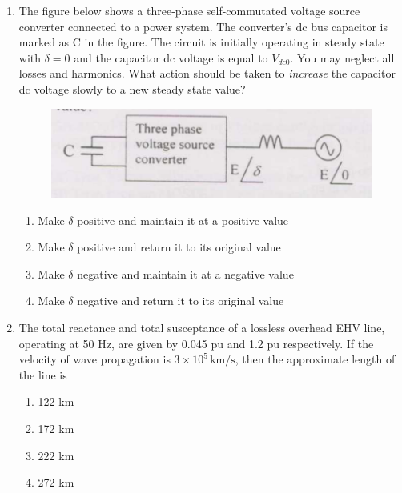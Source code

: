\documentclass[journal]{IEEEtran}
\numberwithin{equation}{enumi}
\numberwithin{figure}{enumi}
\begin{document}
\begin{enumerate}
   \bigskip
   \item The figure below shows a three-phase self-commutated voltage source converter connected to a power system. The converter's dc bus capacitor is marked as C in the figure. The circuit is initially operating in steady state with $\delta = 0$ and the capacitor dc voltage is equal to $V_{dc0}$. You may neglect all losses and harmonics. What action should be taken to \textit{increase} the capacitor dc voltage slowly to a new steady state value?
   \begin{figure}[!ht]
    \centering
    \includegraphics[width=\linewidth]{figs/9.png}
    \caption{}
   \end{figure}
   \begin{multicols}{2}
   \begin{enumerate}
        \item Make $\delta$ positive and maintain it at a positive value
        \item Make $\delta$ positive and return it to its original value
        \item Make $\delta$ negative and maintain it at a negative value
        \item Make $\delta$ negative and return it to its original value
    \end{enumerate}
    \end{multicols}
    \bigskip
    \item The total reactance and total susceptance of a lossless overhead EHV line, operating at 50 Hz, are given by 0.045 pu and 1.2 pu respectively. If the velocity of wave propagation is $3 \times 10^5 \, \text{km/s}$, then the approximate length of the line is
    \begin{multicols}{4}
    \begin{enumerate}
        \item 122 km
        \item 172 km
        \item 222 km
        \item 272 km
    \end{enumerate}
    \end{multicols}

\end{enumerate}
\end{document}
